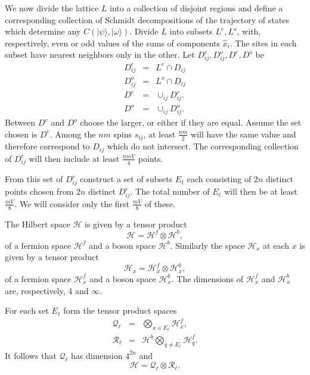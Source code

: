 \documentclass[twocolumn,amsmath,amssymb]{revtex4-1}
\begin{document}
We now divide the lattice $L$ into a collection
of disjoint regions and define a corresponding
collection of Schmidt decompositions of
the trajectory of states
which determine any $C( |\psi \rangle , |\omega \rangle )$.
Divide $L$ into subsets $L^e, L^o$, 
with, respectively, even or odd values of the sums
of components $\hat{x}_i$. The sites in each subset 
have nearest neighbors only in the other.
Let $D^e_{ij}, D^o_{ij}, D^e, D^o$ be 
\begin{subequations}
\begin{eqnarray}
\label{defdije}
D^e_{ij} & = & L^e \cap D_{ij} \\
D^o_{ij} & = & L^o \cap D_{ij} \\
D^e & = & \cup_{ij} D^e_{ij}. \\
D^o & = & \cup_{ij} D^o_{ij}.
\end{eqnarray}
\end{subequations}
Between $D^e$ and $D^o$ choose the larger,
or either if they are equal.
Assume the set chosen is $D^e$.
Among the $nm$ spins $s_{ij}$, at least $\frac{nm}{2}$
will have the same value and therefore correspond
to $D_{ij}$ which do not intersect.
The corresponding collection of $D^e_{ij}$
will then include at least $\frac{nmV}{4}$ points.

From this set of $D^e_{ij}$ construct a set of subsets $E_\ell$ 
each consisting of $2n$ distinct points chosen from $2n$ distinct $D^e_{ij}$.
The total number of $E_\ell$ will then be
at least $\frac{m V}{8}$.
We will consider only the first $\frac{m V}{8}$
of these.

The Hilbert space $\mathcal{H}$ is given by a tensor product
\begin{equation}
  \label{fermionbosonproduct}
  \mathcal{H} = \mathcal{H}^f \otimes \mathcal{H}^b,
\end{equation}
of a fermion space $\mathcal{H}^f$ and a boson space $\mathcal{H}^b$.
Similarly the space $\mathcal{H}_x$ at each $x$
is given by a tensor product
\begin{equation}
  \label{fermionbosonproductx}
  \mathcal{H}_x = \mathcal{H}_x^f \otimes \mathcal{H}_x^b,
\end{equation}
of a fermion space $\mathcal{H}_x^f$ and
a boson space $\mathcal{H}_x^b$.
The dimensions of
$\mathcal{H}_x^f$ and $\mathcal{H}_x^b$
are, respectively, 4 and $\infty$.

For each set $E_\ell$ form the 
tensor product spaces
\begin{subequations}
\begin{eqnarray}
\label{defqell}
\mathcal{Q}_\ell &=& \bigotimes_{x \in E_\ell} \mathcal{H}_x^f, \\
\label{defrell}
\mathcal{R}_\ell &=& \mathcal{H}^b\bigotimes_{q \ne E_\ell} \mathcal{H}_q^f.
\end{eqnarray}
\end{subequations}
It follows that $\mathcal{Q}_\ell$ has dimension $4^{2n}$
and
\begin{equation}
\label{deftp}
\mathcal{H} = \mathcal{Q}_\ell \otimes \mathcal{R}_\ell.
\end{equation}
\end{document}
